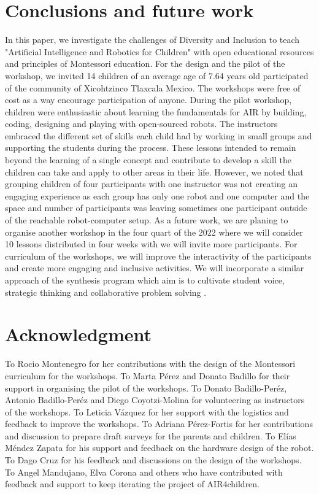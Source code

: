 \documentclass[conference]{IEEEtran}
\begin{document}
\section{Conclusions and future work}
In this paper, we investigate the challenges of Diversity and Inclusion to teach "Artificial Intelligence and Robotics for Children" with open educational resources and principles of Montessori education. 
For the design and the pilot of the workshop, we invited 14 children of an average age of 7.64 years old participated of the community of Xicohtzinco Tlaxcala Mexico.
The workshops were free of cost as a way encourage participation of anyone. 
During the pilot workshop, children were enthusiastic about learning the fundamentals for AIR by building, coding, designing and playing with open-sourced robots. The instructors embraced the different set of skills each child had by working in small groups and supporting the students during the process. These lessons intended to remain beyond the learning of a single concept and contribute to develop a skill the children can take and apply to other areas in their life.
However, we noted that grouping children of four participants with one instructor was not creating an engaging experience as each group has only one robot and one computer and the space and number of participants was leaving sometimes one participant outside of the reachable robot-computer setup.
As a future work, we are planing to organise another workshop in the four quart of the 2022 where we will consider 10 lessons distributed in four weeks with we will invite more participants.
For curriculum of the workshops, we will improve the interactivity of the participants and create more engaging and inclusive activities. We will incorporate a similar approach of the synthesis program which aim is to cultivate student voice, strategic thinking and collaborative problem solving \cite{synthesis2022}.



\section*{Acknowledgment}
To Rocio Montenegro for her contributions with the design of the Montessori curriculum for the workshops.
To Marta P\'erez and Donato Badillo for their support in organising the pilot of the workshops.
To Donato Badillo-Per\'ez, Antonio Badillo-Per\'ez and Diego Coyotzi-Molina for volunteering as instructors of the workshops.
To Leticia V\'azquez for her support with the logistics and feedback to improve the workshops.
To Adriana P\'erez-Fortis for her contributions and discussion to prepare draft surveys for the parents and children. 
To El\'ias M\'endez Zapata for his support and feedback on the hardware design of the robot.
To Dago Cruz for his feedback and discussions on the design of the workshops.
To Angel Mandujano, Elva Corona and others who have contributed with feedback and support to keep iterating the project of AIR4children. 
\end{document}
